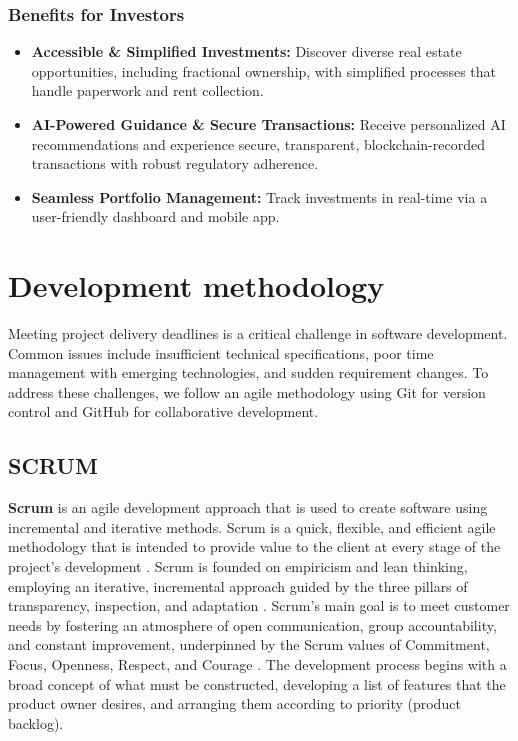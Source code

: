 \subsubsection*{Benefits for Investors}
\begin{itemize}
    \item \textbf{Accessible \& Simplified Investments:} Discover diverse real estate opportunities, including fractional ownership, with simplified processes that handle paperwork and rent collection.
    \item \textbf{AI-Powered Guidance \& Secure Transactions:} Receive personalized AI recommendations and experience secure, transparent, blockchain-recorded transactions with robust regulatory adherence.
    \item \textbf{Seamless Portfolio Management:} Track investments in real-time via a user-friendly dashboard and mobile app.
\end{itemize}


\section{Development methodology}

Meeting project delivery deadlines is a critical challenge in software development. Common issues include insufficient technical specifications, poor time management with emerging technologies, and sudden requirement changes. To address these challenges, we follow an agile methodology using Git for version control and GitHub for collaborative development.

\subsection{SCRUM}

\textbf{\textcolor{primary}{Scrum}} is an agile development approach that is used to create software using incremental and iterative methods. Scrum is a quick, flexible, and efficient agile methodology that is intended to provide value to the client at every stage of the project's development \cite{ScrumGuide2020}. Scrum is founded on empiricism and lean thinking, employing an iterative, incremental approach guided by the three pillars of transparency, inspection, and adaptation \cite{ScrumGuide2020}. Scrum's main goal is to meet customer needs by fostering an atmosphere of open communication, group accountability, and constant improvement, underpinned by the Scrum values of Commitment, Focus, Openness, Respect, and Courage \cite{ScrumGuide2020}. The development process begins with a broad concept of what must be constructed, developing a list of features that the product owner desires, and arranging them according to priority (product backlog).

